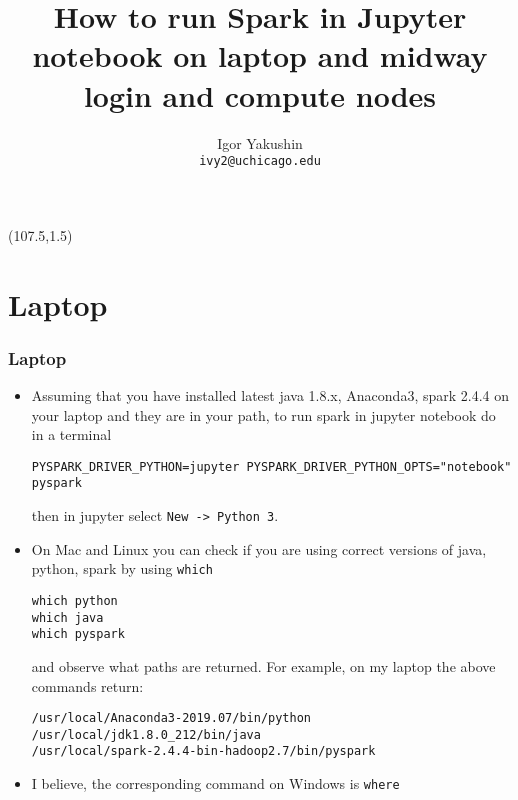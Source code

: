 \documentclass{beamer}
\title{\huge{How to run Spark in Jupyter notebook on laptop and midway login and compute nodes}}
\author{Igor Yakushin \\ \texttt{ivy2@uchicago.edu}}
\date{}
\newcommand{\SPARK}{
\begin{textblock}{14}(107.5,1.5)
  \pgfuseimage{spark}
\end{textblock}
}
\begin{document}



\begin{frame}
\SPARK
\titlepage
\end{frame}


\section{Laptop}

\begin{frame}[fragile]
  \frametitle{Laptop}
  
\begin{itemize}
\item Assuming that you have installed latest java 1.8.x, Anaconda3, spark 2.4.4 on your laptop and they are in your path,
  to run spark in jupyter notebook do in a terminal
  {\tiny
    {\color{mycolorcli}
\begin{verbatim}
PYSPARK_DRIVER_PYTHON=jupyter PYSPARK_DRIVER_PYTHON_OPTS="notebook" pyspark
\end{verbatim}
    }
  }
then in jupyter select \verb|New -> Python 3|.

\item On Mac and Linux you can check if you are using correct versions of java, python, spark by using {\color{mycolorcli}\verb|which|}
  {\small
    {\color{mycolorcli}
\begin{verbatim}
which python
which java
which pyspark
\end{verbatim}
    }
  }
  and observe what paths are returned. For example, on my laptop the above commands return:
  {\small
    {\color{mycolorcli}
\begin{verbatim}
/usr/local/Anaconda3-2019.07/bin/python
/usr/local/jdk1.8.0_212/bin/java
/usr/local/spark-2.4.4-bin-hadoop2.7/bin/pyspark
\end{verbatim}
    }
  }
\item I believe, the corresponding command on Windows is {\color{mycolorcli}\verb|where|}
\end{itemize}

\end{frame}
\end{document}

